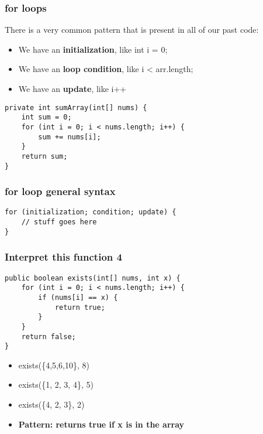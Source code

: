 \documentclass{beamer}
\begin{document}
\begin{frame}[fragile]
\frametitle{for loops}
There is a very common pattern that is present in all of our past code:
\begin{itemize}
\item{We have an \textbf{initialization}, like int i = 0;}
\item{We have an \textbf{loop condition}, like i < arr.length;}
\item{We have an \textbf{update}, like i++}
\end{itemize}
\pause
\begin{lstlisting}[style=basenopause]
private int sumArray(int[] nums) {
    int sum = 0;
    for (int i = 0; i < nums.length; i++) {
        sum += nums[i];
    }
    return sum;
}
\end{lstlisting}
\end{frame}

\begin{frame}[fragile]
\frametitle{for loop general syntax}
\begin{lstlisting}[style=basenopause]
for (initialization; condition; update) {
    // stuff goes here
}
\end{lstlisting}
\end{frame}

\begin{frame}[fragile]
\frametitle{Interpret this function 4}

\begin{lstlisting}[style=basenopause]
public boolean exists(int[] nums, int x) {
    for (int i = 0; i < nums.length; i++) {
        if (nums[i] == x) {
            return true;
        }
    }
    return false;
}
\end{lstlisting}

\begin{itemize}
\item<2-> exists(\{4,5,6,10\}, 8)
\item<3-> exists(\{1, 2, 3, 4\}, 5)
\item<4-> exists(\{4, 2, 3\}, 2)
\item<5-> \textbf{Pattern: returns true if x is in the array}
\end{itemize}
\end{frame}
\end{document}
